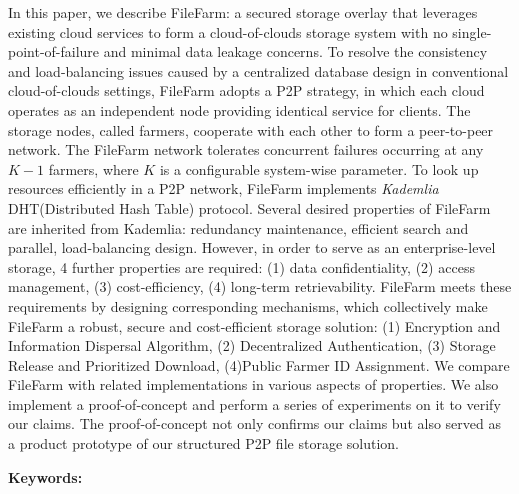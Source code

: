 \begin{abstracten}
  In this paper, we describe FileFarm: a secured storage overlay that leverages existing cloud services to form a cloud-of-clouds storage system with no single-point-of-failure and minimal data leakage concerns. To resolve the consistency and load-balancing issues caused by a centralized database design in conventional cloud-of-clouds settings, FileFarm adopts a P2P strategy, in which each cloud operates as an independent node providing identical service for clients. The storage nodes, called farmers, cooperate with each other to form a peer-to-peer network. The FileFarm network tolerates concurrent failures occurring at any $K-1$ farmers, where $K$ is a configurable system-wise parameter. To look up resources efficiently in a P2P network, FileFarm implements \textit{Kademlia} DHT(Distributed Hash Table) protocol\cite{maymounkov2002kademlia}. Several desired properties of FileFarm are inherited from Kademlia: redundancy maintenance, efficient search and parallel, load-balancing design. However, in order to serve as an enterprise-level storage, 4 further properties are required: (1) data confidentiality, (2) access management, (3) cost-efficiency, (4) long-term retrievability. FileFarm meets these requirements by designing corresponding mechanisms, which collectively  make FileFarm a robust, secure and cost-efficient storage solution: (1) Encryption and Information Dispersal Algorithm, (2) Decentralized Authentication, (3) Storage Release and Prioritized Download, (4)Public Farmer ID Assignment. We compare FileFarm with related implementations in various aspects of properties. We also implement a proof-of-concept and perform a series of experiments on it to verify our claims.  The proof-of-concept not only confirms our claims but also served as a product prototype of our structured P2P file storage solution.

\bigbreak
\noindent \textbf{Keywords:}{\, \makeatletter \@keywordsen \makeatother}
\end{abstracten}
